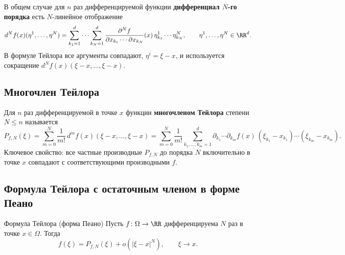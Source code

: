 В общем случае для $n$ раз дифференцируемой функции \textbf{дифференциал $N$-го порядка}
есть $N$-линейное отображение
\[
d^N f(x)(\eta^1,\dots,\eta^N)
=\sum_{k_1=1}^d\cdots\sum_{k_N=1}^d
\frac{\partial^N f}{\partial x_{k_1}\cdots\partial x_{k_N}}(x)\,
\eta^1_{k_1}\cdots\eta^N_{k_N},
\qquad \eta^1,\dots,\eta^N\in\RR^d.
\]
В формуле Тейлора все аргументы совпадают, $\eta^i=\xi-x$, и используется
сокращение $d^N f(x)(\xi-x,\dots,\xi-x)$.

\subsection*{Многочлен Тейлора}

Для $n$ раз дифференцируемой в точке $x$ функции \textbf{многочленом Тейлора}
степени $N\le n$ называется
\[
P_{f,N}(\xi)=\sum_{m=0}^{N}\frac{1}{m!}\,d^m f(x)(\xi-x,\dots,\xi-x)
=\sum_{m=0}^{N}\frac{1}{m!}\sum_{k_1,\dots,k_m=1}^{d}
\partial_{k_1}\cdots\partial_{k_m} f(x)\,(\xi_{k_1}-x_{k_1})\cdots(\xi_{k_m}-x_{k_m}).
\]
Ключевое свойство: все частные производные $P_{f,N}$ до порядка $N$ включительно в
точке $x$ совпадают с соответствующими производными $f$.

\subsection*{Формула Тейлора с остаточным членом в форме Пеано}

\begin{Theorem}{Формула Тейлора (форма Пеано)}{}
	Пусть $f\colon\Omega\to\RR$ дифференцируема $N$ раз в точке $x\in\Omega$. Тогда
	\[
	f(\xi)=P_{f,N}(\xi)+o(|\xi-x|^N),\qquad \xi\to x.
	\]
\end{Theorem}

